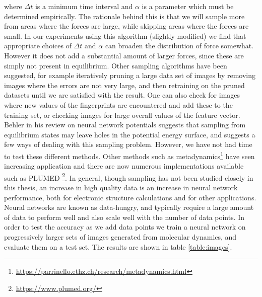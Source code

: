 where $\Delta t$ is a minimum time interval and $\alpha$ is a parameter
which must be determined empirically.
The rationale behind this is that we will sample more from
areas where the forces are large, while skipping areas
where the forces are small.
In our experiments using this algorithm (slightly modified)
we find that appropriate choices of $\Delta t$ and $\alpha$
can broaden the distribution of force somewhat.
However it does not add a substantial amount of larger forces, since
these are simply not present in equilibrium.
Other sampling algorithms have been suggested, for example iteratively
pruning a large data set of images by removing images where
the errors are not very large, and then retraining on the pruned datasets
until we are satisfied with the result.
One can also check for images where new values of the fingerprints
are encountered and add these to the training set, or checking
images for large overall values of the feature vector. 
Behler in his review\cite{behler2011neural} on neural network potentials
suggests that sampling from equilibrium states may leave holes
in the potential energy surface, and suggests a few ways of dealing
with this sampling problem.
However, we have not had time to test these different methods.
Other methods such as metadynamics\footnote{
\url{https://parrinello.ethz.ch/research/metadynamics.html}}
have seen increasing application and there are now numerous implementations
available such as PLUMED \footnote{\url{https://www.plumed.org/}}.
In general, though sampling has not been studied closely in this thesis,
an increase in high quality data is an increase in neural network
performance, both for electronic structure calculations
and for other applications.
Neural networks are known as data-hungry, and typically require
a large amount of data to perform well and also scale well
with the number of data points. 
In order to test the accuracy as we add data points
we train a neural network on progressively larger sets of images generated 
from molecular dynamics, and evaluate them on a test set.
The results are shown in table \ref{table:images}.

